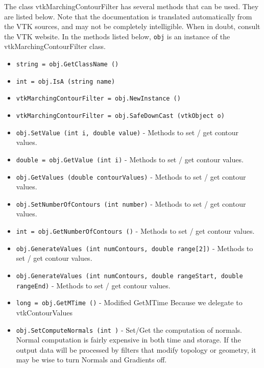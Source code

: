 The class vtkMarchingContourFilter has several methods that can be used.
  They are listed below.
Note that the documentation is translated automatically from the VTK sources,
and may not be completely intelligible.  When in doubt, consult the VTK website.
In the methods listed below, \verb|obj| is an instance of the vtkMarchingContourFilter class.
\begin{itemize}
\item  \verb|string = obj.GetClassName ()|

\item  \verb|int = obj.IsA (string name)|

\item  \verb|vtkMarchingContourFilter = obj.NewInstance ()|

\item  \verb|vtkMarchingContourFilter = obj.SafeDownCast (vtkObject o)|

\item  \verb|obj.SetValue (int i, double value)| -  Methods to set / get contour values.

\item  \verb|double = obj.GetValue (int i)| -  Methods to set / get contour values.

\item  \verb|obj.GetValues (double contourValues)| -  Methods to set / get contour values.

\item  \verb|obj.SetNumberOfContours (int number)| -  Methods to set / get contour values.

\item  \verb|int = obj.GetNumberOfContours ()| -  Methods to set / get contour values.

\item  \verb|obj.GenerateValues (int numContours, double range[2])| -  Methods to set / get contour values.

\item  \verb|obj.GenerateValues (int numContours, double rangeStart, double rangeEnd)| -  Methods to set / get contour values.

\item  \verb|long = obj.GetMTime ()| -  Modified GetMTime Because we delegate to vtkContourValues

\item  \verb|obj.SetComputeNormals (int )| -  Set/Get the computation of normals. Normal computation is fairly
 expensive in both time and storage. If the output data will be
 processed by filters that modify topology or geometry, it may be
 wise to turn Normals and Gradients off.


\end{itemize}
